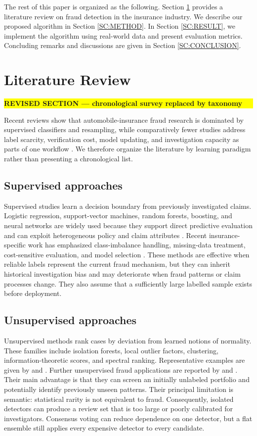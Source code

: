 \documentclass[12pt]{article}
\newcommand{\revmark}[1]{\par\noindent\colorbox{yellow}{%
  \parbox{\dimexpr\linewidth-2\fboxsep}{\raggedright\strut\textbf{#1}}}%
  \par\smallskip}
\begin{document}
The rest of this paper is organized as the following. Section
\ref{SC:LR} provides a literature review on fraud detection in the
insurance industry. We describe our proposed algorithm in Section
\ref{SC:METHOD}. In Section \ref{SC:RESULT}, we implement the
algorithm using real-world data and present evaluation metrics.
Concluding remarks and discussions are given in Section
\ref{SC:CONCLUSION}.


\section{Literature Review}\label{SC:LR}
\revmark{REVISED SECTION --- chronological survey replaced by taxonomy}

Recent reviews show that automobile-insurance fraud research is dominated by
supervised classifiers and resampling, while comparatively fewer studies
address label scarcity, verification cost, model updating, and investigation
capacity as parts of one workflow \cite{A61,Schrijver2024}. We therefore
organize the literature by learning paradigm rather than presenting a
chronological list.

\subsection{Supervised approaches}
Supervised studies learn a decision boundary from previously investigated
claims. Logistic regression, support-vector machines, random forests, boosting,
and neural networks are widely used because they support direct predictive
evaluation and can exploit heterogeneous policy and claim attributes
\cite{A41,A80}. Recent insurance-specific work has emphasized class-imbalance
handling, missing-data treatment, cost-sensitive evaluation, and model
selection \cite{BanulescuRadu2024,Khalil2024,Ding2025}. These methods are
effective when reliable labels represent the current fraud mechanism, but they
can inherit historical investigation bias and may deteriorate when fraud
patterns or claim processes change. They also assume that a sufficiently large
labelled sample exists before deployment.

\subsection{Unsupervised approaches}
Unsupervised methods rank cases by deviation from learned notions of normality.
These families include isolation forests, local outlier factors, clustering,
information-theoretic scores, and spectral ranking. Representative examples
are given by \cite{A46} and \cite{A57}. Further unsupervised fraud applications
are reported by \cite{Nian2016} and \cite{Gomes2021}. Their main advantage is
that they can screen
an initially unlabeled portfolio and potentially identify previously unseen
patterns. Their principal limitation is semantic: statistical rarity is not
equivalent to fraud. Consequently, isolated detectors can produce a review set
that is too large or poorly calibrated for investigators. Consensus voting can
reduce dependence on one detector, but a flat ensemble still applies every
expensive detector to every candidate.
\end{document}
